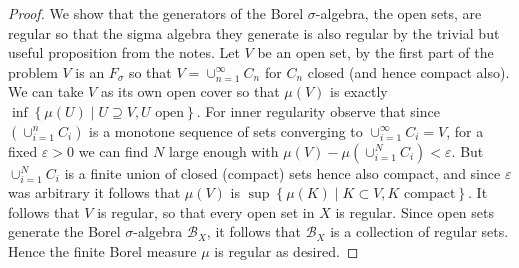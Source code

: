 \documentclass[11pt]{article}
\newcommand{\cbr}[1]{\left\{#1\right\}}
\begin{document}
\begin{enumerate}
\begin{proof}
        We show that the generators of the Borel $\sigma$-algebra, the open sets, are regular so that the sigma algebra they generate is also regular by the trivial but useful proposition from the notes. Let $V$ be an open set, by the first part of the problem $V$ is an $F_\sigma$ so that $V = \cup_{n=1}^\infty C_n$ for $C_n$ closed (and hence compact also). We can take $V$ as its own open cover so that $\mu(V)$ is exactly $\inf\cbr{\mu(U)\mid U\supseteq V, U\text{ open}}$. For inner regularity observe that since $(\cup_{i=1}^n C_i)$ is a monotone sequence of sets converging to $\cup_{i=1}^\infty C_i = V$, for a fixed $\varepsilon>0$ we can find $N$ large enough with $\mu(V) - \mu(\cup_{i=1}^N C_i)< \varepsilon$. But $\cup_{i=1}^N C_i$ is a finite union of closed (compact) sets hence also compact, and since $\varepsilon$ was arbitrary it follows that $\mu(V)$ is $\sup\cbr{\mu(K)\mid K\subset V,K\text{ compact}}$. It follows that $V$ is regular, so that every open set in $X$ is regular. Since open sets generate the Borel $\sigma$-algebra $\mathscr{B}_X$, it follows that $\mathscr{B}_X$ is a collection of regular sets. Hence the finite Borel measure $\mu$ is regular as desired. 
    \end{proof}
\end{enumerate}
\end{document}
